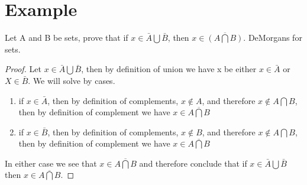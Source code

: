\documentclass[../MATH-2000-Notes.tex]{subfiles}
\begin{document}
\section{Example}
Let A and B be sets, prove that if \(x \in \bar{A}\bigcup \bar{B}\), then \(x\in \overline{(A\bigcap B)}\). DeMorgans for sets.
\begin{proof}
    Let \(x\in \bar{A}\bigcup \bar{B}\), then by definition of union we have x be either \(x \in \bar{A}\) or \(X \in \bar{B}\). We will solve by cases.
    \begin{enumerate}
        \item if \(x\in \bar{A}\), then by definition of complements, \(x\notin A\), and therefore \(x\notin A\bigcap B\), then by definition of complement we have \(x \in \overline{A\bigcap B}\)
        \item  if \(x\in \bar{B}\), then by definition of complements, \(x\notin B\), and therefore \(x\notin A\bigcap B\), then by definition of complement we have \(x \in \overline{A\bigcap B}\)
    \end{enumerate}
    In either case we see that \(x \in \overline{A\bigcap B}\) and therefore conclude that if \(x\in \bar{A} \bigcup \bar{B}\) then \(x \in \overline{A\bigcap B}\).
\end{proof}
\end{document}

